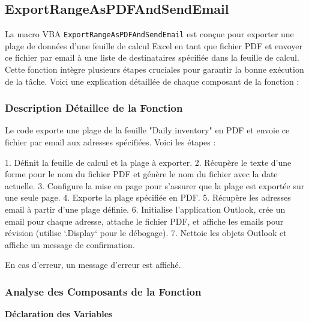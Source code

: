 \documentclass[a4paper, oneside, 12pt, final]{extreport}
\begin{document}
\subsection{ExportRangeAsPDFAndSendEmail}

La macro VBA \texttt{ExportRangeAsPDFAndSendEmail} est conçue pour exporter une plage de données d'une feuille de calcul Excel en tant que fichier PDF et envoyer ce fichier par email à une liste de destinataires spécifiée dans la feuille de calcul. Cette fonction intègre plusieurs étapes cruciales pour garantir la bonne exécution de la tâche. Voici une explication détaillée de chaque composant de la fonction :

\subsubsection{Description Détaillee de la Fonction}
Le code exporte une plage de la feuille "Daily inventory" en PDF et envoie ce fichier par email aux adresses spécifiées. Voici les étapes :

1. Définit la feuille de calcul et la plage à exporter.
2. Récupère le texte d'une forme pour le nom du fichier PDF et génère le nom du fichier avec la date actuelle.
3. Configure la mise en page pour s'assurer que la plage est exportée sur une seule page.
4. Exporte la plage spécifiée en PDF.
5. Récupère les adresses email à partir d'une plage définie.
6. Initialise l'application Outlook, crée un email pour chaque adresse, attache le fichier PDF, et affiche les emails pour révision (utilise `.Display` pour le débogage).
7. Nettoie les objets Outlook et affiche un message de confirmation.

En cas d'erreur, un message d'erreur est affiché.

\subsubsection{Analyse des Composants de la Fonction}

\textbf{Déclaration des Variables}
\end{document}
